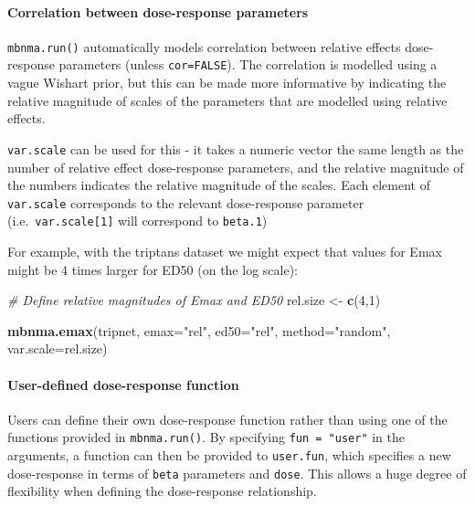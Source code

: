 \documentclass[]{article}
\newenvironment{Shaded}{\begin{snugshade}}{\end{snugshade}}
\newcommand{\CommentTok}[1]{\textcolor[rgb]{0.56,0.35,0.01}{\textit{#1}}}
\newcommand{\DataTypeTok}[1]{\textcolor[rgb]{0.13,0.29,0.53}{#1}}
\newcommand{\DecValTok}[1]{\textcolor[rgb]{0.00,0.00,0.81}{#1}}
\newcommand{\KeywordTok}[1]{\textcolor[rgb]{0.13,0.29,0.53}{\textbf{#1}}}
\newcommand{\NormalTok}[1]{#1}
\newcommand{\StringTok}[1]{\textcolor[rgb]{0.31,0.60,0.02}{#1}}
\let\oldparagraph\paragraph
\renewcommand{\paragraph}[1]{\oldparagraph{#1}\mbox{}}
\begin{document}
\hypertarget{correlation-between-dose-response-parameters}{%
\paragraph{Correlation between dose-response
parameters}\label{correlation-between-dose-response-parameters}}

\texttt{mbnma.run()} automatically models correlation between relative
effects dose-response parameters (unless \texttt{cor=FALSE}). The
correlation is modelled using a vague Wishart prior, but this can be
made more informative by indicating the relative magnitude of scales of
the parameters that are modelled using relative effects.

\texttt{var.scale} can be used for this - it takes a numeric vector the
same length as the number of relative effect dose-response parameters,
and the relative magnitude of the numbers indicates the relative
magnitude of the scales. Each element of \texttt{var.scale} corresponds
to the relevant dose-response parameter (i.e.~\texttt{var.scale{[}1{]}}
will correspond to \texttt{beta.1})

For example, with the triptans dataset we might expect that values for
Emax might be 4 times larger for ED50 (on the log scale):

\begin{Shaded}
\begin{Highlighting}[]
\CommentTok{# Define relative magnitudes of Emax and ED50}
\NormalTok{rel.size <-}\StringTok{ }\KeywordTok{c}\NormalTok{(}\DecValTok{4}\NormalTok{,}\DecValTok{1}\NormalTok{)}

\KeywordTok{mbnma.emax}\NormalTok{(tripnet, }\DataTypeTok{emax=}\StringTok{"rel"}\NormalTok{, }\DataTypeTok{ed50=}\StringTok{"rel"}\NormalTok{, }\DataTypeTok{method=}\StringTok{"random"}\NormalTok{, }
           \DataTypeTok{var.scale=}\NormalTok{rel.size)}
\end{Highlighting}
\end{Shaded}

\hypertarget{user-defined-dose-response-function}{%
\paragraph{User-defined dose-response
function}\label{user-defined-dose-response-function}}

Users can define their own dose-response function rather than using one
of the functions provided in \texttt{mbnma.run()}. By specifying
\texttt{fun\ =\ "user"} in the arguments, a function can then be
provided to \texttt{user.fun}, which specifies a new dose-response in
terms of \texttt{beta} parameters and \texttt{dose}. This allows a huge
degree of flexibility when defining the dose-response relationship.
\end{document}
